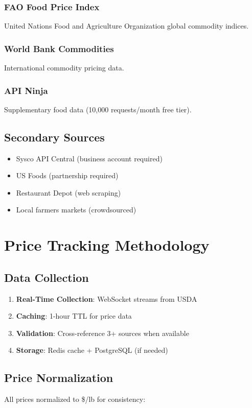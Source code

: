 \documentclass[11pt,a4paper]{article}
\begin{document}
\subsubsection{FAO Food Price Index}
United Nations Food and Agriculture Organization global commodity indices.

\subsubsection{World Bank Commodities}
International commodity pricing data.

\subsubsection{API Ninja}
Supplementary food data (10,000 requests/month free tier).

\subsection{Secondary Sources}
\begin{itemize}
    \item Sysco API Central (business account required)
    \item US Foods (partnership required)
    \item Restaurant Depot (web scraping)
    \item Local farmers markets (crowdsourced)
\end{itemize}

\section{Price Tracking Methodology}

\subsection{Data Collection}
\begin{enumerate}
    \item \textbf{Real-Time Collection}: WebSocket streams from USDA
    \item \textbf{Caching}: 1-hour TTL for price data
    \item \textbf{Validation}: Cross-reference 3+ sources when available
    \item \textbf{Storage}: Redis cache + PostgreSQL (if needed)
\end{enumerate}

\subsection{Price Normalization}
All prices normalized to \$/lb for consistency:
\end{document}

